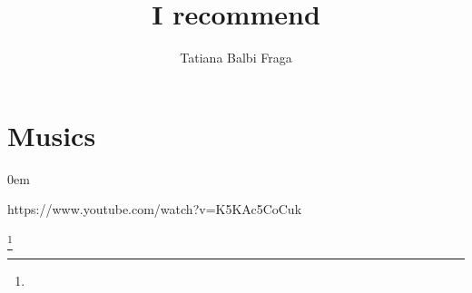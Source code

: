 \documentclass[11pt]{article}
\title{\textbf{I recommend}}
\author{Tatiana Balbi Fraga}
\date{}
\begin{document}
\maketitle
\thispagestyle{empty}

\section{Musics}
\begin{description}
\addtolength{\itemindent}{0.80cm}
\itemsep0em 
\item[Indila - Dernière Danse] https://www.youtube.com/watch?v=K5KAc5CoCuk
\end{description}
\footnote{} 
\end{document}
